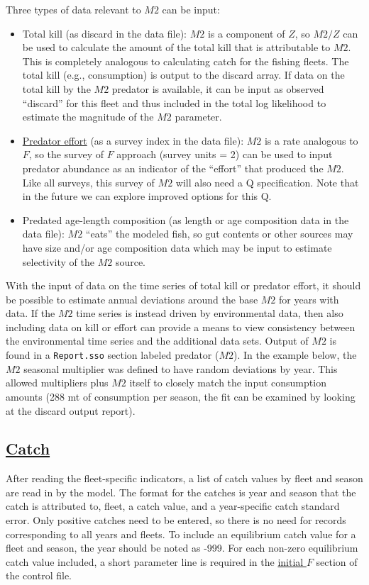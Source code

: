 Three types of data relevant to $M2$ can be input:

\begin{itemize}
	\item Total kill (as discard in the data file): $M2$ is a component of $Z$, so $M2/Z$ can be used to calculate the amount of the total kill that is attributable to $M2$. This is completely analogous to calculating catch for the fishing fleets. The total kill (e.g., consumption) is output to the discard array. If data on the total kill by the $M2$ predator is available, it can be input as observed ``discard'' for this fleet and thus included in the total log likelihood to estimate the magnitude of the $M2$ parameter.
	
	\item \hyperlink{PredEffort}{Predator effort} (as a survey index in the data file): $M2$ is a rate analogous to $F$, so the survey of $F$ approach (survey units = 2) can be used to input predator abundance as an indicator of the ``effort'' that produced the $M2$. Like all surveys, this survey of $M2$ will also need a Q specification. Note that in the future we can explore improved options for this Q.
	
	\item Predated age-length composition (as length or age composition data in the data file): $M2$ ``eats'' the modeled fish, so gut contents or other sources may have size and/or age composition data which may be input to estimate selectivity of the $M2$ source. 
\end{itemize}

With the input of data on the time series of total kill or predator effort, it should be possible to estimate annual deviations around the base $M2$ for years with data. If the $M2$ time series is instead driven by environmental data, then also including data on kill or effort can provide a means to view consistency between the environmental time series and the additional data sets. Output of $M2$ is found in a \texttt{Report.sso} section labeled predator ($M2$). In the example below, the $M2$ seasonal multiplier was defined to have random deviations by year. This allowed multipliers plus $M2$ itself to closely match the input consumption amounts (288 mt of consumption per season, the fit can be examined by looking at the discard output report).

\hypertarget{Catch}{}
\subsection[Catch]{\protect\hyperlink{Catch}{Catch}}
\hypertarget{CatchFormat}{}
After reading the fleet-specific indicators, a list of catch values by fleet and season are read in by the model. The format for the catches is year and season that the catch is attributed to, fleet, a catch value, and a year-specific catch standard error. Only positive catches need to be entered, so there is no need for records corresponding to all years and fleets. To include an equilibrium catch value for a fleet and season, the year should be noted as -999. For each non-zero equilibrium catch value included, a short parameter line is required in the \hyperlink{InitF}{initial $F$} section of the control file.

